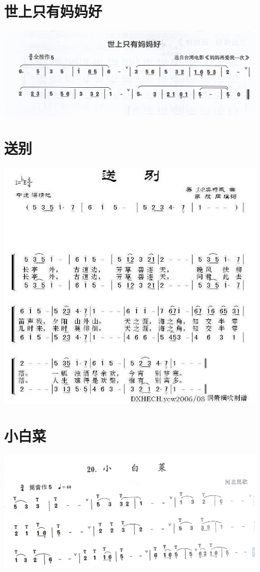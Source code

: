 \documentclass[cn,pad,chinese,chinesefont=nofont]{elegantbook}
\begin{document}
\section{世上只有妈妈好}
	\includegraphics[width=\textwidth]{dongxiao/Scan 17-1.jpeg}
\section{送别}
    \includegraphics[width=\textwidth]{dongxiao/20200324送别.jpg}  
\section{小白菜}            
	\includegraphics[width=\textwidth]{dongxiao/IMG_0933.jpg}                  
\end{document}
